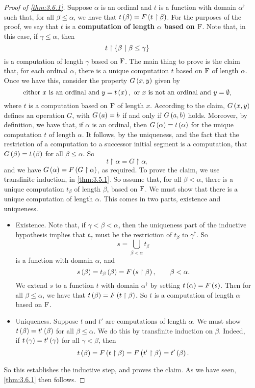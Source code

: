\begin{proof}[Proof of \ref{thm:3.6.1}]
Suppose $ \alpha $ is an ordinal and $ t $ is a function with domain $ \alpha^\dagger $ such that, for all $ \beta \le \alpha $, we have that $ t\br{\beta} = F\br{t \upharpoonright \beta} $. For the purposes of the proof, we say that $ t $ is a \textbf{computation of length $ \alpha $ based on $ \mathrm{F} $}. Note that, in this case, if $ \gamma \le \alpha $, then
$$ t \upharpoonright \cbr{\beta \st \beta \le \gamma} $$
is a computation of length $ \gamma $ based on $ \mathrm{F} $. The main thing to prove is the claim that, for each ordinal $ \alpha $, there is a unique computation $ t $ based on $ \mathrm{F} $ of length $ \alpha $. Once we have this, consider the property $ G\br{x, y} $ given by
$$ \text{either} \ x \ \text{is an ordinal and} \ y = t\br{x}, \ \text{or} \ x \ \text{is not an ordinal and} \ y = \emptyset, $$
where $ t $ is a computation based on $ \mathrm{F} $ of length $ x $. According to the claim, $ G\br{x, y} $ defines an operation $ G $, with $ G\br{a} = b $ if and only if $ G\br{a, b} $ holds. Moreover, by definition, we have that, if $ \alpha $ is an ordinal, then $ G\br{\alpha} = t\br{\alpha} $ for the unique computation $ t $ of length $ \alpha $. It follows, by the uniqueness, and the fact that the restriction of a computation to a successor initial segment is a computation, that $ G\br{\beta} = t\br{\beta} $ for all $ \beta \le \alpha $. So
$$ t \upharpoonright \alpha = G \upharpoonright \alpha, $$
and we have $ G\br{\alpha} = F\br{G \upharpoonright \alpha} $, as required. To prove the claim, we use transfinite induction, in \ref{thm:3.5.1}. So assume that, for all $ \beta < \alpha $, there is a unique computation $ t_\beta $ of length $ \beta $, based on $ \mathrm{F} $. We must show that there is a unique computation of length $ \alpha $. This comes in two parts, existence and uniqueness.
\begin{itemize}
\item Existence. Note that, if $ \gamma < \beta < \alpha $, then the uniqueness part of the inductive hypothesis implies that $ t_\gamma $ must be the restriction of $ t_\beta $ to $ \gamma^\dagger $. So
$$ s = \bigcup_{\beta < \alpha} t_\beta $$
is a function with domain $ \alpha $, and
$$ s\br{\beta} = t_\beta\br{\beta} = F\br{s \upharpoonright \beta}, \qquad \beta < \alpha. $$
We extend $ s $ to a function $ t $ with domain $ \alpha^\dagger $ by setting $ t\br{\alpha} = F\br{s} $. Then for all $ \beta \le \alpha $, we have that $ t\br{\beta} = F\br{t \upharpoonright \beta} $. So $ t $ is a computation of length $ \alpha $ based on $ \mathrm{F} $.
\item Uniqueness. Suppose $ t $ and $ t' $ are computations of length $ \alpha $. We must show $ t\br{\beta} = t'\br{\beta} $ for all $ \beta \le \alpha $. We do this by transfinite induction on $ \beta $. Indeed, if $ t\br{\gamma} = t'\br{\gamma} $ for all $ \gamma < \beta $, then
$$ t\br{\beta} = F\br{t \upharpoonright \beta} = F\br{t' \upharpoonright \beta} = t'\br{\beta}. $$
\end{itemize}
So this establishes the inductive step, and proves the claim. As we have seen, \ref{thm:3.6.1} then follows.
\end{proof}

